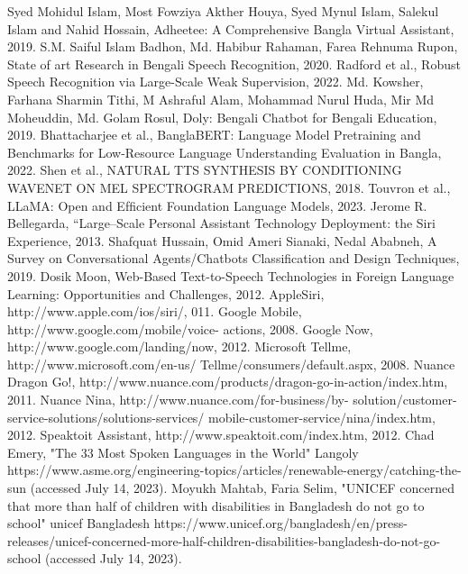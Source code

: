 
\begin{thebibliography}{00}
     Syed Mohidul Islam, Most Fowziya Akther Houya, Syed Mynul Islam, Salekul Islam and Nahid Hossain, Adheetee: A Comprehensive Bangla Virtual Assistant, 2019.
     S.M. Saiful Islam Badhon, Md. Habibur Rahaman, Farea Rehnuma Rupon, State of art Research in Bengali Speech Recognition, 2020.
     Radford et al., Robust Speech Recognition via Large-Scale Weak Supervision, 2022.
     Md. Kowsher, Farhana Sharmin Tithi, M Ashraful Alam, Mohammad Nurul Huda, Mir Md Moheuddin, Md. Golam Rosul, Doly: Bengali Chatbot for Bengali Education, 2019.
     Bhattacharjee et al., BanglaBERT: Language Model Pretraining and Benchmarks for Low-Resource Language Understanding Evaluation in Bangla, 2022.
     Shen et al., NATURAL TTS SYNTHESIS BY CONDITIONING WAVENET ON MEL SPECTROGRAM PREDICTIONS, 2018.
     Touvron et al., LLaMA: Open and Efﬁcient Foundation Language Models, 2023.
     Jerome R. Bellegarda, ``Large–Scale Personal Assistant Technology Deployment: the Siri Experience, 2013.
     Shafquat Hussain, Omid Ameri Sianaki, Nedal Ababneh, A Survey on Conversational Agents/Chatbots Classification and Design Techniques, 2019.
     Dosik Moon, Web-Based Text-to-Speech Technologies in Foreign Language Learning: Opportunities and Challenges, 2012.
     AppleSiri, http://www.apple.com/ios/siri/, 011.
     Google Mobile, http://www.google.com/mobile/voice- actions, 2008.
     Google Now, http://www.google.com/landing/now, 2012.
     Microsoft Tellme, http://www.microsoft.com/en-us/ Tellme/consumers/default.aspx, 2008.
     Nuance Dragon Go!, http://www.nuance.com/products/dragon-go-in-action/index.htm, 2011.
     Nuance Nina, http://www.nuance.com/for-business/by- solution/customer-service-solutions/solutions-services/ mobile-customer-service/nina/index.htm, 2012.
     Speaktoit Assistant, http://www.speaktoit.com/index.htm, 2012.
     Chad Emery, "The 33 Most Spoken Languages in the World" Langoly https://www.asme.org/engineering-topics/articles/renewable-energy/catching-the-sun (accessed July 14, 2023).
     Moyukh Mahtab, Faria Selim, "UNICEF concerned that more than half of children with disabilities in Bangladesh do not go to school" unicef Bangladesh https://www.unicef.org/bangladesh/en/press-releases/unicef-concerned-more-half-children-disabilities-bangladesh-do-not-go-school (accessed July 14, 2023).

\end{thebibliography}

